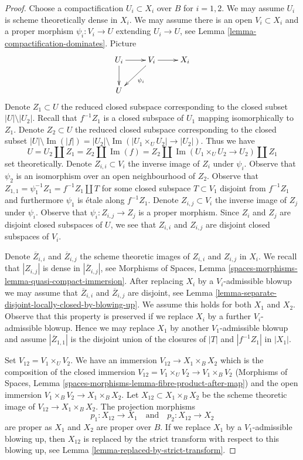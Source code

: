 \documentclass[10pt,a4paper]{amsart}
\theoremstyle{plain}
\theoremstyle{definition}
\theoremstyle{remark}
\numberwithin{equation}{subsection}
\def\Im{\mathop{\mathrm{Im}}}
\begin{document}
\begin{proof}
Choose a compactification $U_i \subset X_i$ over $B$ for $i = 1, 2$. We may
assume $U_i$ is scheme theoretically dense in $X_i$. We may assume there
is an open $V_i \subset X_i$ and a proper morphism
$\psi_i : V_i \to U$ extending $U_i \to U$, see
Lemma \ref{lemma-compactification-dominates}. Picture
$$
\xymatrix{
U_i \ar[r] \ar[d] & V_i \ar[r] \ar[dl]^{\psi_i} & X_i \\
U
}
$$
Denote $Z_1 \subset U$ the reduced closed subspace corresponding
to the closed subset $|U| \setminus |U_2|$. Recall that $f^{-1}Z_1$
is a closed subspace of $U_1$ mapping isomorphically to $Z_1$.
Denote $Z_2 \subset U$ the reduced closed subspace corresponding
to the closed subset $|U| \setminus \Im(|f|) =
|U_2| \setminus \Im(|U_1 \times_U U_2| \to |U_2|)$.
Thus we have
$$
U = U_2 \amalg Z_1 = Z_2 \amalg \Im(f) =
Z_2 \amalg \Im(U_1 \times_U U_2 \to U_2) \amalg Z_1
$$
set theoretically. Denote $Z_{i, i} \subset V_i$ the inverse image of $Z_i$
under $\psi_i$. Observe that $\psi_2$ is an isomorphism over an open
neighbourhood of $Z_2$. Observe that
$Z_{1, 1} = \psi_1^{-1}Z_1 = f^{-1}Z_1 \amalg T$ for some
closed subspace $T \subset V_1$ disjoint from $f^{-1}Z_1$ and furthermore
$\psi_1$ is \'etale along $f^{-1}Z_1$.
Denote $Z_{i, j} \subset V_i$ the inverse image of $Z_j$ under $\psi_i$.
Observe that $\psi_i : Z_{i, j} \to Z_j$ is a proper morphism.
Since $Z_i$ and $Z_j$ are disjoint closed subspaces of $U$, we see that
$Z_{i, i}$ and $Z_{i, j}$ are disjoint closed subspaces of $V_i$.

\medskip\noindent
Denote $\overline{Z}_{i, i}$ and $\overline{Z}_{i, j}$ the
scheme theoretic images of $Z_{i, i}$ and $Z_{i, j}$ in $X_i$.
We recall that $|Z_{i, j}|$ is dense in $|\overline{Z}_{i, j}|$, see
Morphisms of Spaces, Lemma
\ref{spaces-morphisms-lemma-quasi-compact-immersion}.
After replacing $X_i$ by a $V_i$-admissible blowup we may assume that
$\overline{Z}_{i, i}$ and $\overline{Z}_{i, j}$ are disjoint, see
Lemma \ref{lemma-separate-disjoint-locally-closed-by-blowing-up}.
We assume this holds for both $X_1$ and $X_2$.
Observe that this property is preserved if we replace $X_i$
by a further $V_i$-admissible blowup. Hence we may replace $X_1$ by another
$V_1$-admissible blowup and assume $|\overline{Z}_{1, 1}|$
is the disjoint union of the closures of $|T|$ and $|f^{-1}Z_1|$ in $|X_1|$.

\medskip\noindent
Set $V_{12} = V_1 \times_U V_2$. We have an immersion
$V_{12} \to X_1 \times_B X_2$ which is the composition of the closed
immersion $V_{12} = V_1 \times_U V_2 \to V_1 \times_B V_2$
(Morphisms of Spaces, Lemma
\ref{spaces-morphisms-lemma-fibre-product-after-map})
and the open immersion $V_1 \times_B V_2 \to X_1 \times_B X_2$.
Let $X_{12} \subset X_1 \times_B X_2$ be the scheme theoretic image of
$V_{12} \to X_1 \times_B X_2$. The projection morphisms
$$
p_1 : X_{12} \to X_1
\quad\text{and}\quad
p_2 : X_{12} \to X_2
$$
are proper as $X_1$ and $X_2$ are proper over $B$. If we replace $X_1$ by a
$V_1$-admissible blowing up, then $X_{12}$ is replaced by
the strict transform with respect to this blowing up, see
Lemma \ref{lemma-replaced-by-strict-transform}.


\end{proof}
\end{document}
